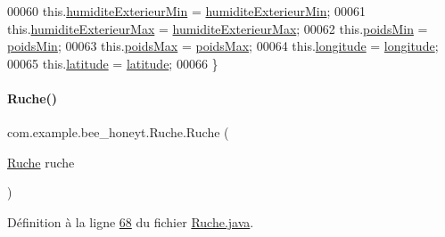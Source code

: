 \begin{DoxyCode}
00060         this.\hyperlink{classcom_1_1example_1_1bee__honeyt_1_1_ruche_ad58b8815412827add256f6c6e11d3043}{humiditeExterieurMin} = \hyperlink{classcom_1_1example_1_1bee__honeyt_1_1_ruche_ad58b8815412827add256f6c6e11d3043}{humiditeExterieurMin};
00061         this.\hyperlink{classcom_1_1example_1_1bee__honeyt_1_1_ruche_a76e636b4d5e0a18b187905e0d6d73a71}{humiditeExterieurMax} = \hyperlink{classcom_1_1example_1_1bee__honeyt_1_1_ruche_a76e636b4d5e0a18b187905e0d6d73a71}{humiditeExterieurMax};
00062         this.\hyperlink{classcom_1_1example_1_1bee__honeyt_1_1_ruche_a3408f099f2fab8700353e6e266fe8221}{poidsMin} = \hyperlink{classcom_1_1example_1_1bee__honeyt_1_1_ruche_a3408f099f2fab8700353e6e266fe8221}{poidsMin};
00063         this.\hyperlink{classcom_1_1example_1_1bee__honeyt_1_1_ruche_a5901bf432f6d2de0e5facb8952277cbc}{poidsMax} = \hyperlink{classcom_1_1example_1_1bee__honeyt_1_1_ruche_a5901bf432f6d2de0e5facb8952277cbc}{poidsMax};
00064         this.\hyperlink{classcom_1_1example_1_1bee__honeyt_1_1_ruche_aaeb7392ff8f3f26203e23f1dd57ae89f}{longitude} = \hyperlink{classcom_1_1example_1_1bee__honeyt_1_1_ruche_aaeb7392ff8f3f26203e23f1dd57ae89f}{longitude};
00065         this.\hyperlink{classcom_1_1example_1_1bee__honeyt_1_1_ruche_a6a75dfabd9812334d502756f91fa4aa9}{latitude} = \hyperlink{classcom_1_1example_1_1bee__honeyt_1_1_ruche_a6a75dfabd9812334d502756f91fa4aa9}{latitude};
00066     \}
\end{DoxyCode}
\mbox{\label{classcom_1_1example_1_1bee__honeyt_1_1_ruche_a30f0d3e27135f5721ef7cd5117235896}} 
\paragraph{\texorpdfstring{Ruche()}{Ruche()}\hspace{0.1cm}{\footnotesize\ttfamily [3/3]}}
{\footnotesize\ttfamily com.\+example.\+bee\+\_\+honeyt.\+Ruche.\+Ruche (\begin{DoxyParamCaption}\item[{\hyperlink{classcom_1_1example_1_1bee__honeyt_1_1_ruche}{Ruche}}]{ruche }\end{DoxyParamCaption})}



Définition à la ligne \hyperlink{_ruche_8java_source_l00068}{68} du fichier \hyperlink{_ruche_8java_source}{Ruche.\+java}.



